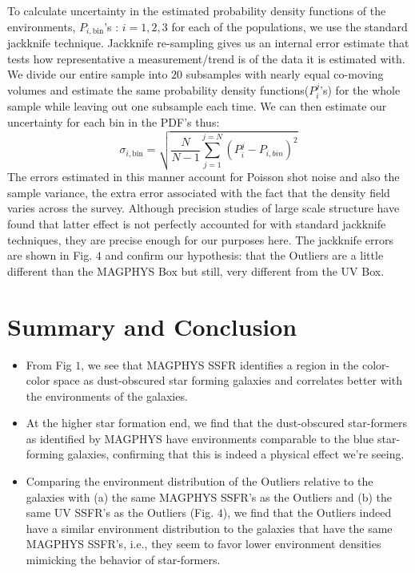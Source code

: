 \documentclass[iop]{emulateapj}
\begin{document}
To calculate uncertainty in the estimated probability density 
functions of the environments, $P_{i,\mathrm{bin}}$'s : 
$i = 1,2,3$ for each of the populations, we use the standard 
jackknife technique. Jackknife re-sampling gives us an internal 
error estimate that tests how representative a measurement/trend 
is of the data it is estimated with. We divide our entire 
sample into $20$ subsamples with nearly equal co-moving 
volumes and estimate the same probability density 
functions($P^{j}_{i}$'s) for the whole sample while leaving 
out one subsample each time. We can then estimate our uncertainty 
for each bin in the PDF's thus:
$$ \sigma_{i, \mathrm{bin}} = \sqrt{\frac{N}{N-1} \sum_{j = 1}^{j = N} (P^{j}_{i} - P_{i,bin})^{2}} $$
The errors estimated in this manner account for Poisson shot
noise and also the sample variance, the extra error associated
with the fact that the density field varies across the survey. 
Although precision studies of large scale structure have found
that latter effect is not perfectly accounted for with standard
jackknife techniques, they are precise enough for our purposes
here. The jackknife errors are shown in Fig. $4$ and confirm our 
hypothesis: that the Outliers are a little different than the 
MAGPHYS Box but still, very different from the UV Box.

\section{Summary and Conclusion}


\begin{itemize}
\item{From Fig $1$, we see that MAGPHYS SSFR identifies a region in the color-color space as dust-obscured star forming galaxies and correlates better with the environments of the galaxies.}
\item{At the higher star formation end, we find that the dust-obscured star-formers as identified by MAGPHYS have environments comparable to the blue star-forming galaxies, confirming that this is indeed a physical effect we're seeing.}
\item{Comparing the environment distribution of the Outliers relative to the galaxies with (a) the same MAGPHYS SSFR's as the Outliers and (b) the same UV SSFR's as the Outliers (Fig. $4$), we find that the Outliers indeed have a similar environment distribution to the galaxies that have the same MAGPHYS SSFR's, i.e., they seem to favor lower environment densities mimicking the behavior of star-formers.}
\end{itemize}
\end{document}
